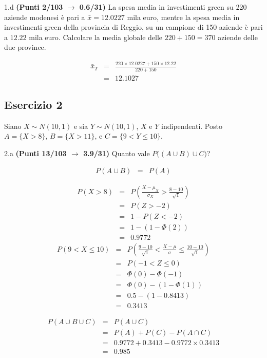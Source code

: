 \documentclass[
  11pt,
]{book}
\theoremstyle{mytheoremstyle}
\theoremstyle{mydefstyle}
\newenvironment{sol}
  {
  \begin{tcolorbox}[enhanced,breakable,arc=0.1mm,boxrule=1pt,colback=white,colframe=iblue,
  title=\bf \fontfamily{lmss}\selectfont \hspace{.5 cm} Soluzione,drop fuzzy shadow]

}{
\end{tcolorbox}
  }
\begin{document}
1.d \textbf{(Punti 2/103 \(\rightarrow\) 0.6/31)} La spesa media in investimenti green su 220 aziende modenesi è pari a \(\bar x=12.0227\) mila euro, mentre la spesa media in investimenti green della provincia di Reggio, su un campione di 150 aziende è pari a \(12.22\) mila euro.
Calcolare la media globale delle \(220 + 150 = 370\) aziende delle due province.

\begin{eqnarray*}
\bar x_T&=&\frac{220\times12.0227+150\times12.22}{220+150}\\
&=& 12.1027
\end{eqnarray*}

\subsection{Esercizio 2}\label{esercizio-2-13}

Siano \(X\sim N(10,1)\) e sia \(Y\sim N(10,1)\), \(X\) e \(Y\) indipendenti. Posto \(A=\{X>8\}\), \(B=\{X>11\}\), e \(C=\{9<Y\le 10\}\).

2.a \textbf{(Punti 13/103 \(\rightarrow\) 3.9/31)} Quanto vale \(P\Big((A\cup B)\cup C\Big)\)?

\begin{sol}
\begin{eqnarray*}
P(A\cup B)&=&P(A)
\end{eqnarray*}

\begin{eqnarray*}
      P( X   >   8 ) 
        &=& P\left(  \frac { X  -  \mu_X }{ \sigma_X }  >  \frac { 8  -  10 }{\sqrt{ 1 }} \right)  \\
                 &=& P\left(  Z   >   -2 \right) \\    &=& 1-P(Z< -2 )\\ 
                 &=&  1-(1-\Phi( 2 )) \\ &=&  0.9772 
      \end{eqnarray*}\begin{eqnarray*}
   P( 9 < X \leq  10 ) &=& P\left( \frac { 9  -  10 }{\sqrt{ 1 }} < \frac { X  -  \mu }{ \sigma } \leq \frac { 10  -  10 }{\sqrt{ 1 }}\right)  \\
              &=& P\left(  -1  < Z \leq  0 \right) \\
              &=& \Phi( 0 )-\Phi( -1 )\\
              &=&  \Phi( 0 )-(1-\Phi( 1 )) \\ &=&  0.5 -(1- 0.8413 ) \\ 
              &=&  0.3413 
   \end{eqnarray*}

\begin{eqnarray*}
P(A\cup B\cup C)&=&P(A\cup C)\\
&=&P(A)+P(C)-P(A\cap C)\\
&=& 0.9772 +0.3413-0.9772\times 0.3413\\
&=& 0.985
\end{eqnarray*}

\end{sol}
\end{document}
